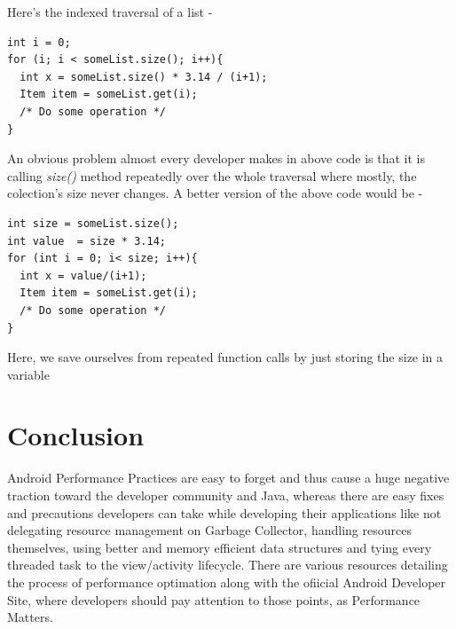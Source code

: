 \documentclass[journal]{IEEEtran}
\begin{document}
Here's the indexed traversal of a list -
\begin{verbatim}
int i = 0;
for (i; i < someList.size(); i++){
  int x = someList.size() * 3.14 / (i+1);
  Item item = someList.get(i);
  /* Do some operation */
} 
\end{verbatim}
An obvious problem almost every developer makes in above code is that it is calling \textit{size()} method repeatedly over the whole traversal where mostly, the colection's size never changes. A better version of the above code would be - 
\begin{verbatim}
int size = someList.size();
int value  = size * 3.14;
for (int i = 0; i< size; i++){
  int x = value/(i+1);
  Item item = someList.get(i);
  /* Do some operation */	
}
\end{verbatim}
Here, we save ourselves from repeated function calls by just storing the size in a variable

\section{Conclusion}
Android Performance Practices are easy to forget and thus cause a huge negative traction toward the developer community and Java, whereas there are easy fixes and precautions developers can take while developing their applications like not delegating resource management on Garbage Collector, handling resources themselves, using better and memory efficient data structures and tying every threaded task to the view/activity lifecycle. There are various resources detailing the process of performance optimation along with the ofiicial Android Developer Site, where developers should pay attention to those points, as Performance Matters.
\end{document}
